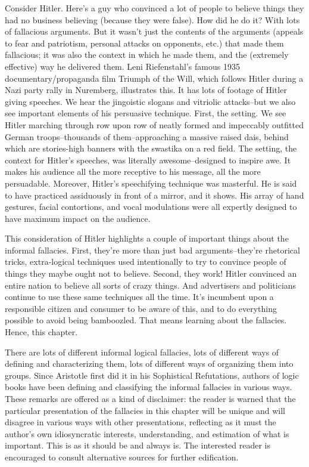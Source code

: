 Consider Hitler. Here's a guy who convinced a lot of people to believe things they had no business
believing (because they were false). How did he do it? With lots of fallacious arguments. But it
wasn't just the contents of the arguments (appeals to fear and patriotism, personal attacks on
opponents, etc.) that made them fallacious; it was also the context in which he made them, and the
(extremely effective) way he delivered them. Leni Riefenstahl's famous 1935
documentary/propaganda film Triumph of the Will, which follows Hitler during a Nazi party rally
in Nuremberg, illustrates this. It has lots of footage of Hitler giving speeches. We hear the jingoistic
slogans and vitriolic attacks--but we also see important elements of his persuasive technique.
First, the setting. We see Hitler marching through row upon row of neatly formed and impeccably
outfitted German troops--thousands of them--approaching a massive raised dais, behind which
are stories-high banners with the swastika on a red field. The setting, the context for Hitler's
speeches, was literally awesome--designed to inspire awe. It makes his audience all the more
receptive to his message, all the more persuadable. Moreover, Hitler's speechifying technique was
masterful. He is said to have practiced assiduously in front of a mirror, and it shows. His array of
hand gestures, facial contortions, and vocal modulations were all expertly designed to have
maximum impact on the audience.

This consideration of Hitler highlights a couple of important things about the informal fallacies.
First, they're more than just bad arguments--they're rhetorical tricks, extra-logical techniques
used intentionally to try to convince people of things they maybe ought not to believe. Second,
they work! Hitler convinced an entire nation to believe all sorts of crazy things. And advertisers
and politicians continue to use these same techniques all the time. It's incumbent upon a
responsible citizen and consumer to be aware of this, and to do everything possible to avoid being
bamboozled. That means learning about the fallacies. Hence, this chapter.

There are lots of different informal logical fallacies, lots of different ways of defining and
characterizing them, lots of different ways of organizing them into groups. Since Aristotle first did
it in his Sophistical Refutations, authors of logic books have been defining and classifying the
informal fallacies in various ways. These remarks are offered as a kind of disclaimer: the reader is
warned that the particular presentation of the fallacies in this chapter will be unique and will
disagree in various ways with other presentations, reflecting as it must the author's own
idiosyncratic interests, understanding, and estimation of what is important. This is as it should be
and always is. The interested reader is encouraged to consult alternative sources for further
edification.

